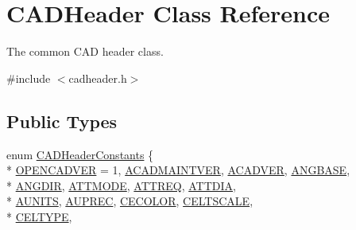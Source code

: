 \hypertarget{class_c_a_d_header}{}\section{C\+A\+D\+Header Class Reference}
\label{class_c_a_d_header}


The common C\+AD header class.  




{\ttfamily \#include $<$cadheader.\+h$>$}

\subsection*{Public Types}
\begin{DoxyCompactItemize}
\item 
enum \hyperlink{class_c_a_d_header_abd894aab7aa85b4c4634e67fb93d6886}{C\+A\+D\+Header\+Constants} \{ \\*
\hyperlink{class_c_a_d_header_abd894aab7aa85b4c4634e67fb93d6886ac570bb6faa7e12a10313aded00349764}{O\+P\+E\+N\+C\+A\+D\+V\+ER} = 1, 
\hyperlink{class_c_a_d_header_abd894aab7aa85b4c4634e67fb93d6886a08eac45804230354d6b972f5a9981971}{A\+C\+A\+D\+M\+A\+I\+N\+T\+V\+ER}, 
\hyperlink{class_c_a_d_header_abd894aab7aa85b4c4634e67fb93d6886a7cb3808df0a44802acb276850d312f1b}{A\+C\+A\+D\+V\+ER}, 
\hyperlink{class_c_a_d_header_abd894aab7aa85b4c4634e67fb93d6886a914b5e6703ac3ae3ba2ad1d8bcc6175e}{A\+N\+G\+B\+A\+SE}, 
\\*
\hyperlink{class_c_a_d_header_abd894aab7aa85b4c4634e67fb93d6886abcc055b7295d45575da28eae50f7f302}{A\+N\+G\+D\+IR}, 
\hyperlink{class_c_a_d_header_abd894aab7aa85b4c4634e67fb93d6886ae8aa631aff58cf84d03bd77da4c50473}{A\+T\+T\+M\+O\+DE}, 
\hyperlink{class_c_a_d_header_abd894aab7aa85b4c4634e67fb93d6886a8cc860ea44c317a03d4dd81a57017c58}{A\+T\+T\+R\+EQ}, 
\hyperlink{class_c_a_d_header_abd894aab7aa85b4c4634e67fb93d6886aeaa7a19dab0af3cb33e7c151bdaced04}{A\+T\+T\+D\+IA}, 
\\*
\hyperlink{class_c_a_d_header_abd894aab7aa85b4c4634e67fb93d6886affaf0b90f87d06c32805139104125920}{A\+U\+N\+I\+TS}, 
\hyperlink{class_c_a_d_header_abd894aab7aa85b4c4634e67fb93d6886a41913505a805581218882d8117d6c63b}{A\+U\+P\+R\+EC}, 
\hyperlink{class_c_a_d_header_abd894aab7aa85b4c4634e67fb93d6886ace72893b71d488480334f9f49434a784}{C\+E\+C\+O\+L\+OR}, 
\hyperlink{class_c_a_d_header_abd894aab7aa85b4c4634e67fb93d6886a54b0492ee3fd90097137c82f5971f674}{C\+E\+L\+T\+S\+C\+A\+LE}, 
\\*
\hyperlink{class_c_a_d_header_abd894aab7aa85b4c4634e67fb93d6886a4239205cf0507d30e15d16a437ff95e5}{C\+E\+L\+T\+Y\+PE}, 

\end{DoxyCompactItemize}
